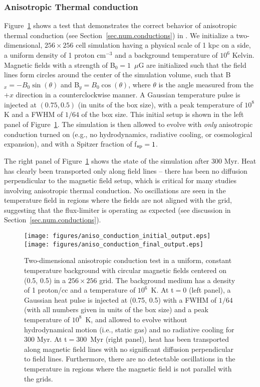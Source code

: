 \subsubsection{Anisotropic Thermal conduction}
\label{sec.tests.conduct}

Figure~\ref{fig.conduct} shows a test that demonstrates the correct
behavior of anisotropic thermal conduction (see
Section~\ref{sec.num.conductions}) in \enzo. We initialize a
two-dimensional, $256 \times 256$ cell simulation having a physical
scale of 1 kpc on a side, a uniform density of 1 proton cm$^{-3}$ and
a background temperature of $10^6$ Kelvin.  Magnetic fields with a
strength of B$_0 = 1$~$\mu$G are initialized such that the field lines
form circles around the center of the simulation volume, such that
B$_x = -B_0\sin(\theta)$ and B$_y = B_0\cos(\theta)$, where $\theta$
is the angle measured from the $+x$ direction in a counterclockwise
manner.  A Gaussian temperature pulse is injected at $(0.75, 0.5)$ (in
units of the box size), with a peak temperature of $10^8$ K and a FWHM
of $1/64$ of the box size.  This initial setup is shown in the left
panel of Figure~\ref{fig.conduct}.  The simulation is then allowed to
evolve with \textit{only} anisotropic conduction turned on (e.g., no
hydrodynamics, radiative cooling, or cosmological expansion), and with
a Spitzer fraction of f$_{\rm sp} = 1$.

The right panel of Figure~\ref{fig.conduct} shows the state of the
simulation after 300 Myr.  Heat has clearly been transported only
along field lines -- there has been no diffusion perpendicular to the
magnetic field setup, which is critical for many studies involving
anisotropic thermal conduction.  No oscillations are seen in the
temperature field in regions where the fields are not aligned with the
grid, suggesting that the flux-limiter is operating as expected (see
discussion in Section~\ref{sec.num.conductions}).

\begin{figure}
\begin{center}
\texttt{[image: figures/aniso\_conduction\_initial\_output.eps]}
\texttt{[image: figures/aniso\_conduction\_final\_output.eps]}
\caption{Two-dimensional anisotropic conduction test in a uniform,
constant temperature background with circular magnetic fields centered
on (0.5, 0.5) in a $256 \times 256$ grid.  The background medium has a density of 1
proton/cc and a temperature of $10^6$~K.  At t$ = 0$ (left panel), a
Gaussian heat pulse is injected at (0.75, 0.5) with a FWHM of $1/64$
(with all numbers given in units of the box size) and a peak
temperature of $10^8$~K, and allowed to evolve without hydrodynamical
motion (i.e., static gas) and no radiative cooling for 300 Myr.  At t$
= 300$~Myr (right panel), heat has been transported along magnetic
field lines with no significant diffusion perpendicular to field
lines. Furthermore, there are no detectable oscillations in the
temperature in regions where the magnetic field is not parallel with
the grids.}
\label{fig.conduct}
\end{center}
\end{figure}

